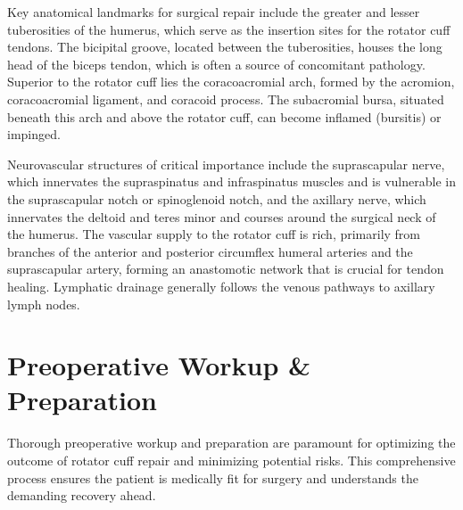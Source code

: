 Key anatomical landmarks for surgical repair include the greater and lesser tuberosities of the humerus, which serve as the insertion sites for the rotator cuff tendons. The bicipital groove, located between the tuberosities, houses the long head of the biceps tendon, which is often a source of concomitant pathology. Superior to the rotator cuff lies the coracoacromial arch, formed by the acromion, coracoacromial ligament, and coracoid process. The subacromial bursa, situated beneath this arch and above the rotator cuff, can become inflamed (bursitis) or impinged. 

Neurovascular structures of critical importance include the suprascapular nerve, which innervates the supraspinatus and infraspinatus muscles and is vulnerable in the suprascapular notch or spinoglenoid notch, and the axillary nerve, which innervates the deltoid and teres minor and courses around the surgical neck of the humerus. The vascular supply to the rotator cuff is rich, primarily from branches of the anterior and posterior circumflex humeral arteries and the suprascapular artery, forming an anastomotic network that is crucial for tendon healing. Lymphatic drainage generally follows the venous pathways to axillary lymph nodes.

\section*{Preoperative Workup \& Preparation}
Thorough preoperative workup and preparation are paramount for optimizing the outcome of rotator cuff repair and minimizing potential risks. This comprehensive process ensures the patient is medically fit for surgery and understands the demanding recovery ahead.

